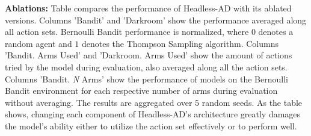 \begin{table}[!t]%
\centering
\caption{\textbf{Ablations:} Table compares the performance of Headless-AD with its ablated versions. Columns 'Bandit' and 'Darkroom' show the performance averaged along all action sets. Bernoulli Bandit performance is normalized, where $0$ denotes a random agent and $1$ denotes the Thompson Sampling algorithm. Columns 'Bandit. Arms Used' and 'Darkroom. Arms Used' show the amount of actions tried by the model during evaluation, also averaged along all the action sets. Columns 'Bandit. \textit{N} Arms' show the performance of models on the Bernoulli Bandit environment for each respective number of arms during evaluation without averaging. The results are aggregated over $5$ random seeds. As the table shows, changing each component of Headless-AD's architecture greatly damages the model's ability either to utilize the action set effectively or to perform well.}
\label{table:ablations}
\vspace{-10pt}
\end{table}

